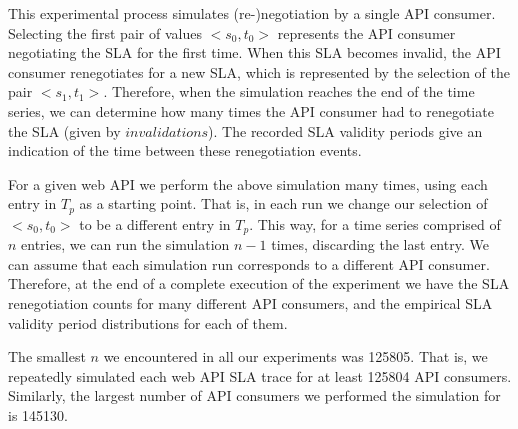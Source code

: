 This experimental process simulates (re-)negotiation by a single API consumer.
Selecting the first pair of values $<s_{0},t_{0}>$ represents
the API consumer negotiating the SLA for the first time. When this SLA becomes invalid, the API consumer
renegotiates for a new SLA, which is represented by the selection of the pair $<s_{1},t_{1}>$. 
Therefore, when the simulation reaches the end of the time series, we can determine how many times the
API consumer had to renegotiate the SLA (given by $invalidations$). The
recorded SLA validity periods give an indication of the time between these renegotiation events.

For a given web API we perform the above simulation many times, using each entry in $T_{p}$ as
a starting point. That is, in each run we change our selection of $<s_{0},t_{0}>$ to be a different
entry in $T_{p}$. This way, for a time series comprised of $n$ entries, we can run the simulation 
$n-1$ times, discarding the last entry. We can assume that each simulation run corresponds to a different API
consumer. Therefore, at the end of a complete execution of the experiment we have the SLA
renegotiation counts for many different API consumers, and the empirical SLA validity period distributions 
for each of them. 

The smallest $n$ we encountered in all our experiments was 125805. That is, we
repeatedly simulated each web API SLA trace 
for at least 125804 API consumers. Similarly, the largest number of API consumers 
we performed the simulation for is 145130.
